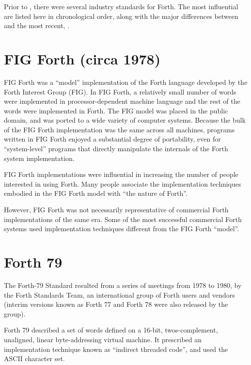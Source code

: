 \cbstart
{} %
\label{annex:diff}
\cbend
{}

Prior to , there were several industry standards for Forth.
The most influential are listed here in chronological order, along
with the major differences between  and the most recent,
.

\section{FIG Forth (circa 1978)} %

FIG Forth was a ``model'' implementation of the Forth language
developed by the Forth Interest Group (FIG). In FIG Forth, a
relatively small number of words were implemented in processor-dependent
machine language and the rest of the words were implemented in Forth.
The FIG model was placed in the public domain, and was ported to a
wide variety of computer systems. Because the bulk of the FIG Forth
implementation was the same across all machines, programs written in
FIG Forth enjoyed a substantial degree of portability, even for
``system-level'' programs that directly manipulate the internals of
the Forth system implementation.

FIG Forth implementations were influential in increasing the number
of people interested in using Forth. Many people associate the
implementation techniques embodied in the FIG Forth model with
``the nature of Forth''.

However, FIG Forth was not necessarily representative of commercial
Forth implementations of the same era. Some of the most successful
commercial Forth systems used implementation techniques different
from the FIG Forth ``model''.


\section{Forth 79} %

The Forth-79 Standard resulted from a series of meetings from 1978
to 1980, by the Forth Standards Team, an international group of Forth
users and vendors (interim versions known as Forth 77 and Forth 78
were also released by the group).

Forth 79 described a set of words defined on a 16-bit, twos-complement,
unaligned, linear byte-addressing virtual machine. It prescribed an
implementation technique known as ``indirect threaded code'', and used
the ASCII character set.


